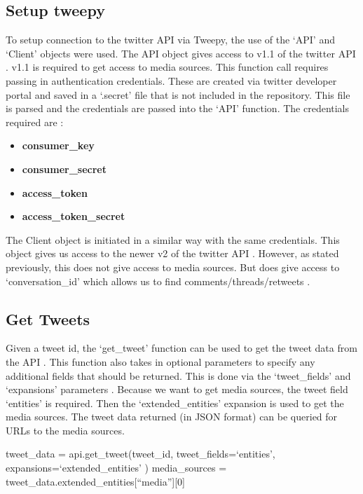 \subsection{Setup tweepy}
To setup connection to the twitter API via Tweepy, the use of the `API' and `Client' objects were used. The API object gives access to v1.1 of the twitter API \cite{tweepy}. v1.1 is 
required to get access to media sources. This function call requires passing in authentication credentials. These are created via twitter developer portal
and saved in a `.secret' file that is not included in the repository. This file is parsed and the credentials are passed into the `API' function. The
credentials required are \cite{tweepy}:
\begin{itemize}
    \item \textbf{consumer\_key}
    \item \textbf{consumer\_secret}
    \item \textbf{access\_token}
    \item \textbf{access\_token\_secret}
\end{itemize}

The Client object is initiated in a similar way with the same credentials. This object gives us access to the newer v2 of the twitter API \cite{tweepy}. However, as stated previously,
this does not give access to media sources. But does give access to `conversation\_id' which allows us to find comments/threads/retweets \cite{tweepy}.
\subsection{Get Tweets}
Given a tweet id, the `get\_tweet' function can be used to get the tweet data from the API \cite{tweepy}. This function also takes in optional parameters to specify any
additional fields that should be returned. This is done via the `tweet\_fields' and `expansions' parameters \cite{tweepy}. Because we want to get media sources, the
tweet field `entities' is required. Then the `extended\_entities' expansion is used to get the media sources. The tweet data returned (in JSON format)
can be queried for URLs to the media sources.
\begin{algorithm}
    \begin{algorithmic}
        \STATE tweet\_data = api.get\_tweet(tweet\_id, 
        \bindent
        \STATE tweet\_fields=`entities',
        \STATE expansions=`extended\_entities'
        \eindent
        \STATE )
        \STATE media\_sources = tweet\_data.extended\_entities[``media''][0]
    \end{algorithmic}
\end{algorithm}

